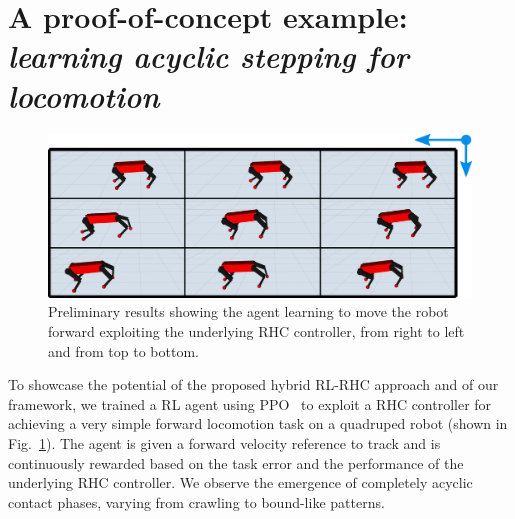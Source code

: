 \section{A proof-of-concept example: \textnormal{\textit{learning acyclic stepping for locomotion}}}
\begin{figure}[t]
	\centering
	\includegraphics[width=0.9\columnwidth]{imgs/proof_of_concept.pdf}
	\caption{Preliminary results showing the agent learning to move the robot forward exploiting the underlying RHC controller, from right to left and from top to bottom.}
	\label{fig:proof}
\end{figure}
To showcase the potential of the proposed hybrid RL-RHC approach and of our framework, we trained a RL agent using PPO~\cite{rl:schulman2017proximal} to exploit a RHC controller for achieving a very simple forward locomotion task on a quadruped robot (shown in Fig.~\ref{fig:proof}). The agent is given a forward velocity reference to track and is continuously rewarded based on the task error and the performance of the underlying RHC controller. We observe the emergence of completely acyclic contact phases, varying from crawling to bound-like patterns.
 